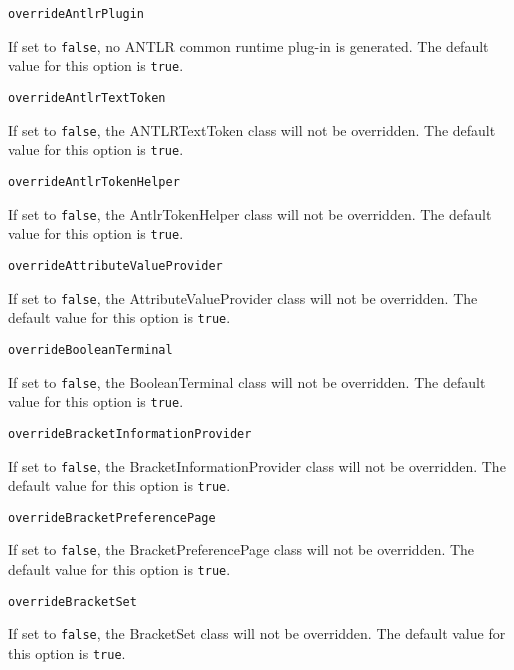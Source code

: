 \noindent\texttt{overrideAntlrPlugin}
\begin{myindentpar}{1cm}
If set to \texttt{false}, no ANTLR common runtime plug-in is generated. The default value for this option is \texttt{true}.
\end{myindentpar}

\noindent\texttt{overrideAntlrTextToken}
\begin{myindentpar}{1cm}
If set to \texttt{false}, the ANTLRTextToken class will not be overridden. The default value for this option is \texttt{true}.
\end{myindentpar}

\noindent\texttt{overrideAntlrTokenHelper}
\begin{myindentpar}{1cm}
If set to \texttt{false}, the AntlrTokenHelper class will not be overridden. The default value for this option is \texttt{true}.
\end{myindentpar}

\noindent\texttt{overrideAttributeValueProvider}
\begin{myindentpar}{1cm}
If set to \texttt{false}, the AttributeValueProvider class will not be overridden. The default value for this option is \texttt{true}.
\end{myindentpar}

\noindent\texttt{overrideBooleanTerminal}
\begin{myindentpar}{1cm}
If set to \texttt{false}, the BooleanTerminal class will not be overridden. The default value for this option is \texttt{true}.
\end{myindentpar}

\noindent\texttt{overrideBracketInformationProvider}
\begin{myindentpar}{1cm}
If set to \texttt{false}, the BracketInformationProvider class will not be overridden. The default value for this option is \texttt{true}.
\end{myindentpar}

\noindent\texttt{overrideBracketPreferencePage}
\begin{myindentpar}{1cm}
If set to \texttt{false}, the BracketPreferencePage class will not be overridden. The default value for this option is \texttt{true}.
\end{myindentpar}

\noindent\texttt{overrideBracketSet}
\begin{myindentpar}{1cm}
If set to \texttt{false}, the BracketSet class will not be overridden. The default value for this option is \texttt{true}.
\end{myindentpar}

